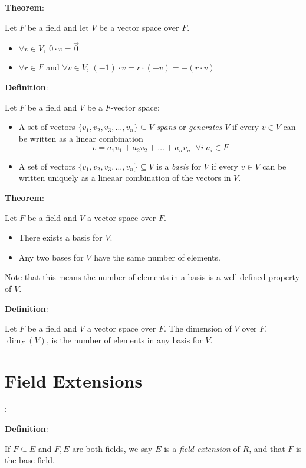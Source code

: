 \documentclass{article}
\begin{document}
\begin{multicols*}{2}
\textbf{Theorem}:

Let $F$ be a field and let $V$ be a vector space over $F$.

\begin{itemize}
    \item $\forall v \in V,\; 0 \cdot v = \vec{0}$
    \item $\forall r \in F$ and $\forall v \in V$, $(-1)\cdot v = r \cdot (-v) = -(r \cdot v)$
\end{itemize}


\textbf{Definition}:

Let $F$ be a field and $V$ be a $F$-vector space: 

\begin{itemize}
    \item A set of vectors $\{v_1,v_2,v_3,\dots, v_n\} \subseteq V$ \textit{spans} or \textit{generates} $V$ if every $v \in V$ can be written as a linear combination \[v = a_1v_1 + a_2v_2 + \dots + a_nv_n\;\; \forall i\;a_i \in F\]
    \item A set of vectors $\{v_1,v_2,v_3,\dots, v_n\} \subseteq V$ is a \textit{basis} for $V$ if every $v \in V$ can be written uniquely as a lineaar combination of the vectors in $V$.
\end{itemize}

\textbf{Theorem}:

Let $F$ be a field and $V$ a vector space over $F$.

\begin{itemize}
    \item There exists a basis for $V$.
    \item Any two bases for $V$ have the same number of elements.
\end{itemize}

Note that this means the number of elements in a basis is a well-defined property of $V$.

\textbf{Definition}:

Let $F$ be a field and $V$ a vector space over $F$. The dimension of $V$ over $F$, $\dim_F(V)$, is the number of elements in any basis for $V$.

\section{Field Extensions}:

\textbf{Definition}:

If $F \subseteq E$ and $F, E$ are both fields, we say $E$ is a \textit{field extension} of $R$, and that $F$ is the base field.


\end{multicols*}
\end{document}
